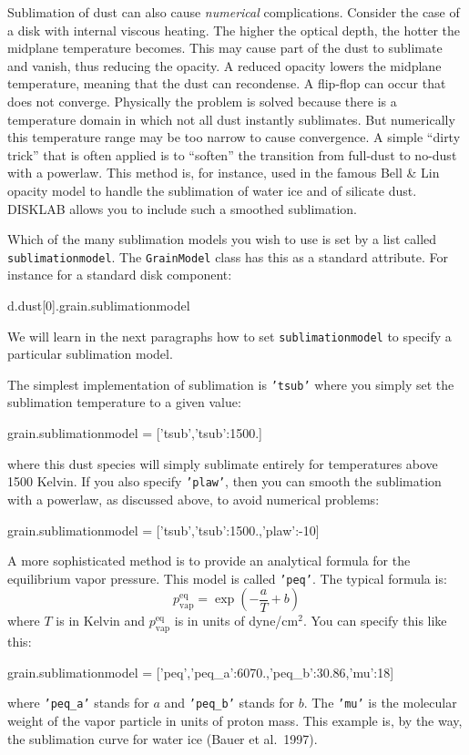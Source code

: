 \documentclass{book}
\newcommand{\code}[1]{{\small\tt #1}}
\begin{document}
Sublimation of dust can also cause {\em numerical} complications. Consider the
case of a disk with internal viscous heating. The higher the optical depth, the
hotter the midplane temperature becomes. This may cause part of the dust to
sublimate and vanish, thus reducing the opacity. A reduced opacity lowers the
midplane temperature, meaning that the dust can recondense. A flip-flop
can occur that does not converge. Physically the problem is solved because
there is a temperature domain in which not all dust instantly sublimates.
But numerically this temperature range may be too narrow to cause convergence.
A simple ``dirty trick'' that is often applied is to ``soften'' the transition
from full-dust to no-dust with a powerlaw. This method is, for instance,
used in the famous Bell \& Lin opacity model to handle the sublimation of
water ice and of silicate dust. {\sf DISKLAB} allows you to include such
a smoothed sublimation.

Which of the many sublimation models you wish to use is set by
a list called \code{sublimationmodel}. The \code{GrainModel} class
has this as a standard attribute. For instance for a standard
disk component:
\begin{codebox}
d.dust[0].grain.sublimationmodel
\end{codebox}
We will learn in the next paragraphs how to set \code{sublimationmodel}
to specify a particular sublimation model.

The simplest implementation of sublimation is \code{'tsub'} where you
simply set the sublimation temperature to a given value:
\begin{codebox}
grain.sublimationmodel = ['tsub',{'tsub':1500.}]
\end{codebox}
where this dust species will simply sublimate entirely for temperatures
above 1500 Kelvin. If you also specify \code{'plaw'}, then you can
smooth the sublimation with a powerlaw, as discussed above, to avoid
numerical problems:
\begin{codebox}
grain.sublimationmodel = ['tsub',{'tsub':1500.,'plaw':-10}]
\end{codebox}

A more sophisticated method is to provide an analytical formula for
the equilibrium vapor pressure. This model is called \code{'peq'}.
The typical formula is:
\begin{equation}
p^{\mathrm{eq}}_{\mathrm{vap}} = \exp\left(-\frac{a}{T}+b\right)
\end{equation}
where $T$ is in Kelvin and $p^{\mathrm{eq}}_{\mathrm{vap}}$ is in units of
dyne/cm$^2$. You can specify this like this:
\begin{codebox}
grain.sublimationmodel = ['peq',{'peq_a':6070.,'peq_b':30.86,'mu':18}]
\end{codebox}
where \code{'peq\_a'} stands for $a$ and \code{'peq\_b'} stands for $b$.  The
\code{'mu'} is the molecular weight of the vapor particle in units of proton
mass. This example is, by the way, the sublimation curve for water ice (Bauer et
al.\ 1997).
\end{document}
